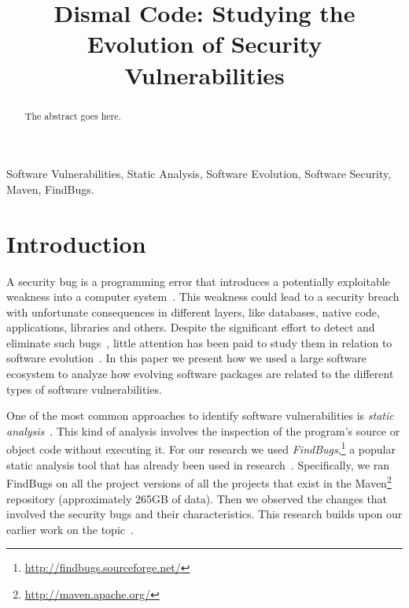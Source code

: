 \documentclass[conference]{IEEEtran}
\begin{document}
\title{Dismal Code: Studying the Evolution of Security Vulnerabilities}


\author{
\and
{}
}

\maketitle

\begin{abstract}
The abstract goes here.
\end{abstract}

\begin{IEEEkeywords}
Software Vulnerabilities, Static Analysis, Software Evolution, Software
Security, Maven, FindBugs.
\end{IEEEkeywords}

\IEEEpeerreviewmaketitle

\section{Introduction}

A security bug is a programming error that introduces a potentially
exploitable weakness into a computer system~\cite{SSL12}. This weakness could lead to a
security breach with unfortunate consequences in different layers, like databases,
native code, applications, libraries and others. Despite the significant
effort to detect and eliminate such bugs~\cite{SZ12}, little attention has been paid to
study them in relation to software evolution~\cite{L96, LRWPT97, IB06}. In this paper we present how we
used a large software ecosystem to analyze how evolving software packages are
related to the different types of software vulnerabilities.

One of the most common approaches to identify software vulnerabilities is
{\it static analysis}~\cite{CW07}. This kind of analysis involves the
inspection of the program's source or object code without executing
it. For our research we used {\it FindBugs},\footnote{\url{http://findbugs.sourceforge.net/}}
a popular static analysis tool that has already been used in
research~\cite{AP10, HP07, HP04}. Specifically, we ran FindBugs on all the project
versions of all the projects that exist in the Maven\footnote{\url{http://maven.apache.org/}}
repository (approximately 265GB of data). Then we observed the changes that
involved the security bugs and their characteristics. This research builds upon
our earlier work on the topic~\cite{MGS12}.
\end{document}
